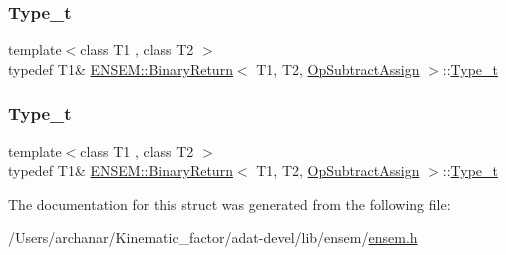 \mbox{\label{structENSEM_1_1BinaryReturn_3_01T1_00_01T2_00_01OpSubtractAssign_01_4_a21f38c2ce7ac4f73a438d38f65705fe7}} 
\subsubsection{\texorpdfstring{Type\_t}{Type\_t}\hspace{0.1cm}{\footnotesize\ttfamily [2/3]}}
{\footnotesize\ttfamily template$<$class T1 , class T2 $>$ \\
typedef T1\& \mbox{\hyperlink{structENSEM_1_1BinaryReturn}{E\+N\+S\+E\+M\+::\+Binary\+Return}}$<$ T1, T2, \mbox{\hyperlink{structENSEM_1_1OpSubtractAssign}{Op\+Subtract\+Assign}} $>$\+::\mbox{\hyperlink{structENSEM_1_1BinaryReturn_3_01T1_00_01T2_00_01OpSubtractAssign_01_4_a21f38c2ce7ac4f73a438d38f65705fe7}{Type\+\_\+t}}}

\mbox{\label{structENSEM_1_1BinaryReturn_3_01T1_00_01T2_00_01OpSubtractAssign_01_4_a21f38c2ce7ac4f73a438d38f65705fe7}} 
\subsubsection{\texorpdfstring{Type\_t}{Type\_t}\hspace{0.1cm}{\footnotesize\ttfamily [3/3]}}
{\footnotesize\ttfamily template$<$class T1 , class T2 $>$ \\
typedef T1\& \mbox{\hyperlink{structENSEM_1_1BinaryReturn}{E\+N\+S\+E\+M\+::\+Binary\+Return}}$<$ T1, T2, \mbox{\hyperlink{structENSEM_1_1OpSubtractAssign}{Op\+Subtract\+Assign}} $>$\+::\mbox{\hyperlink{structENSEM_1_1BinaryReturn_3_01T1_00_01T2_00_01OpSubtractAssign_01_4_a21f38c2ce7ac4f73a438d38f65705fe7}{Type\+\_\+t}}}



The documentation for this struct was generated from the following file\+:\begin{DoxyCompactItemize}
\item 
/\+Users/archanar/\+Kinematic\+\_\+factor/adat-\/devel/lib/ensem/\mbox{\hyperlink{adat-devel_2lib_2ensem_2ensem_8h}{ensem.\+h}}\end{DoxyCompactItemize}
